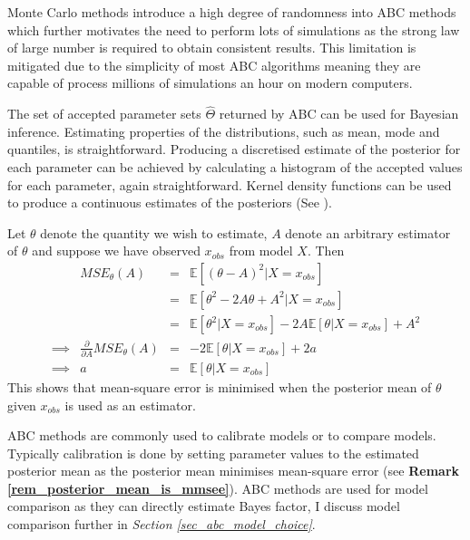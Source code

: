 \documentclass[11pt,a4paper]{article}
\newcommand*{\expect}{\mathbb{E}}
\theoremstyle{break}
\begin{document}
  \par Monte Carlo methods introduce a high degree of randomness into ABC methods which further motivates the need to perform lots of simulations as the strong law of large number is required to obtain consistent results. This limitation is mitigated due to the simplicity of most ABC algorithms meaning they are capable of process millions of simulations an hour on modern computers.

  \par The set of accepted parameter sets $\hat\Theta$ returned by ABC can be used for Bayesian inference. Estimating properties of the distributions, such as mean, mode and quantiles, is straightforward. Producing a discretised estimate of the posterior for each parameter can be achieved by calculating a histogram of the accepted values for each parameter, again straightforward. Kernel density functions can be used to produce a continuous estimates of the posteriors (See \cite[]{review_of_kde}).

  \begin{box_remark}\label{rem_posterior_mean_is_mmsee}
    Let $\theta$ denote the quantity we wish to estimate, $A$ denote an arbitrary estimator of $\theta$ and suppose we have observed $x_{obs}$ from model $X$. Then
    \[\begin{array}{rrcl}
      &MSE_\theta(A)&=&\expect\left[(\theta-A)^2|X=x_{obs}\right]\\
      &&=&\expect\left[\theta^2-2A\theta+A^2|X=x_{obs}\right]\\
      &&=&\expect\left[\theta^2|X=x_{obs}\right]-2A\expect\left[\theta|X=x_{obs}\right]+A^2\\
      \implies&\frac{\partial}{\partial A}MSE_\theta(A)&=&-2\expect[\theta|X=x_{obs}]+2a\\
      \implies&a&=&\expect[\theta|X=x_{obs}]
    \end{array}\]
    This shows that mean-square error is minimised when the posterior mean of $\theta$ given $x_{obs}$ is used as an estimator.
  \end{box_remark}

  \par ABC methods are commonly used to calibrate models or to compare models. Typically calibration is done by setting parameter values to the estimated posterior mean as the posterior mean minimises mean-square error (see \textbf{Remark \ref{rem_posterior_mean_is_mmsee}}). ABC methods are used for model comparison as they can directly estimate Bayes factor, I discuss model comparison further in \textit{Section \ref{sec_abc_model_choice}}.
\end{document}
